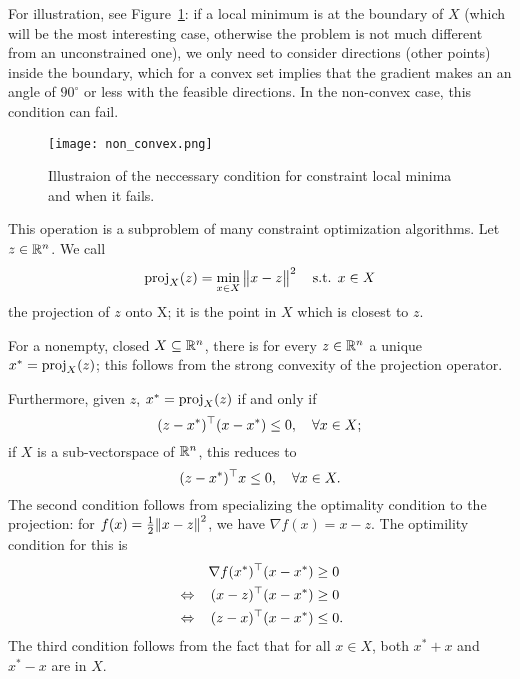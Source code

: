 \documentclass{article}
\begin{document}
For illustration, see Figure~\ref{fig:non_convex}: if a local minimum is at the boundary of \(X\)
(which will be the most interesting case, otherwise the problem is not much different from an
unconstrained one), we only need to consider directions (other points) inside the boundary, which
for a convex set implies that the gradient makes an an angle of \(90^\circ\) or less with the
feasible directions.  In the non-convex case, this condition can fail.

\begin{figure}[h]
  \centering
  \texttt{[image: non\_convex.png]}
  \caption{Illustraion of the neccessary condition for constraint local minima and when it
    fails.\label{fig:non_convex}}
\end{figure}



This operation is a subproblem of many constraint optimization algorithms.  Let \(z \in \mathbb{R}^n\).  We
call
\begin{equation*}
  \proj_X(z) = \min_{x \in X}\, \enVert[1]{x - z}^2 \quad\text{s.t. } x \in X
\end{equation*}
the projection of \(z\) onto X; it is the point in \(X\) which is closest to \(z\).



For a nonempty, closed \(X \subseteq \mathbb{R}^n\), there is for every \(z \in \mathbb{R}^n\) a unique
\(x^* = \operatorname{proj}_X(z)\); this follows from the strong convexity of the projection operator.

Furthermore, given \(z\), \(x^* = \operatorname{proj}_X(z)\) if and only if
\begin{equation*}
  (z - x^*)^{\top}(x - x^*) \leq 0, \quad\forall x \in X;
\end{equation*}
if \(X\) is a sub-vectorspace of \(\mathbb{R}^n\), this reduces to 
\begin{equation*}
  (z - x^*)^{\top}x \leq 0, \quad\forall x \in X.
\end{equation*}
The second condition follows from specializing the optimality condition to the projection: for
\(f(x) = \frac{1}{2} \enVert{x - z}^2\), we have \(\nabla f(x) = x - z\).  The optimility condition
for this is
\begin{alignat*}{2}
  &\quad & \nabla f(x^*)^{\top}(x - x^*) &\geq 0 \\
  &\Leftrightarrow & (x - z)^{\top}(x - x^*) &\geq 0 \\
  &\Leftrightarrow & (z - x)^{\top}(x - x^*) &\leq 0.
\end{alignat*}
The third condition follows from the fact that for all \(x \in X\), both \(x^* + x\) and \(x^* - x\)
are in \(X\).
\end{document}
